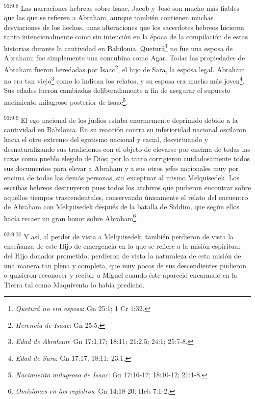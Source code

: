 \par
\textsuperscript{93:9.8} Las narraciones hebreas sobre Isaac, Jacob y José son mucho más fiables que las que se refieren a Abraham, aunque también contienen muchas desviaciones de los hechos, unas alteraciones que los sacerdotes hebreos hicieron tanto intencionalmente como sin intención en la época de la compilación de estas historias durante la cautividad en Babilonia. Queturá\footnote{\textit{Queturá no era esposa}: Gn 25:1; 1 Cr 1:32.} no fue una esposa de Abraham; fue simplemente una concubina como Agar. Todas las propiedades de Abraham fueron heredadas por Isaac\footnote{\textit{Herencia de Isaac}: Gn 25:5.}, el hijo de Sara, la esposa legal. Abraham no era tan viejo\footnote{\textit{Edad de Abraham}: Gn 17:1,17; 18:11; 21:2,5; 24:1; 25:7-8.} como lo indican los relatos, y su esposa era mucho más joven\footnote{\textit{Edad de Sara}: Gn 17:17; 18:11; 23:1.}. Sus edades fueron cambiadas deliberadamente a fin de asegurar el supuesto nacimiento milagroso posterior de Isaac\footnote{\textit{Nacimiento milagroso de Isaac}: Gn 17:16-17; 18:10-12; 21:1-8.}.

\par
\textsuperscript{93:9.9} El ego nacional de los judíos estaba enormemente deprimido debido a la cautividad en Babilonia. En su reacción contra su inferioridad nacional oscilaron hacia el otro extremo del egotismo nacional y racial, desvirtuando y desnaturalizando sus tradiciones con el objeto de elevarse por encima de todas las razas como pueblo elegido de Dios; por lo tanto corrigieron cuidadosamente todos sus documentos para elevar a Abraham y a sus otros jefes nacionales muy por encima de todas las demás personas, sin exceptuar al mismo Melquisedek. Los escribas hebreos destruyeron pues todos los archivos que pudieron encontrar sobre aquellos tiempos trascendentales, conservando únicamente el relato del encuentro de Abraham con Melquisedek después de la batalla de Siddim, que según ellos hacía recaer un gran honor sobre Abraham\footnote{\textit{Omisiones en los registros}: Gn 14:18-20; Heb 7:1-2.}.

\par
\textsuperscript{93:9.10} Y así, al perder de vista a Melquisedek, también perdieron de vista la enseñanza de este Hijo de emergencia en lo que se refiere a la misión espiritual del Hijo donador prometido; perdieron de vista la naturaleza de esta misión de una manera tan plena y completa, que muy pocos de sus descendientes pudieron o quisieron reconocer y recibir a Miguel cuando éste apareció encarnado en la Tierra tal como Maquiventa lo había predicho.

